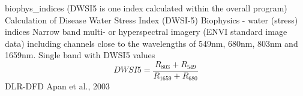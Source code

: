 %
{ %
biophys\_indices (DWSI5 is one index calculated within the overall program)
}
%
{ %
Calculation of Disease Water Stress Index (DWSI-5)
}
%
{ %
Biophysics - water (stress) indices
}
%
{ %
Narrow band multi- or hyperspectral imagery (ENVI standard image data) including channels close to the wavelengths of 549nm, 680nm, 803nm and 1659nm.\bigskip
}
%
{ %
Single band with DWSI5 values
}
%
{ %
\begin{displaymath}
DWSI5 = \frac{R_{803}+R_{549}}{R_{1659}+R_{680}}
\end{displaymath}
}
%
{ %
DLR-DFD
}
%
{ %
Apan et al., 2003
}
